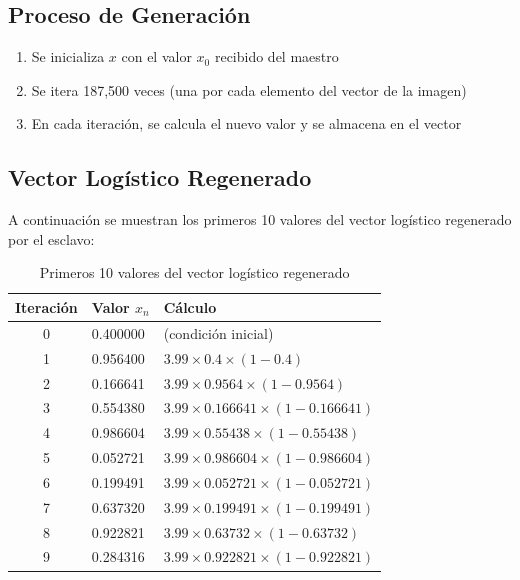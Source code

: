 \documentclass[12pt,a4paper]{article}
\begin{document}
	\subsection{Proceso de Generación}
	
	\begin{enumerate}
		\item Se inicializa $x$ con el valor $x_0$ recibido del maestro
		\item Se itera 187,500 veces (una por cada elemento del vector de la imagen)
		\item En cada iteración, se calcula el nuevo valor y se almacena en el vector
	\end{enumerate}
	
	\subsection{Vector Logístico Regenerado}
	
	A continuación se muestran los primeros 10 valores del vector logístico regenerado por el esclavo:
	
	\begin{table}[H]
		\centering
		\caption{Primeros 10 valores del vector logístico regenerado}
		\label{tab:logistic_esclavo}
		\begin{tabular}{@{}cll@{}}
			\toprule
			\textbf{Iteración} & \textbf{Valor $x_n$} & \textbf{Cálculo} \\ \midrule
			0 & 0.400000 & (condición inicial) \\
			1 & 0.956400 & $3.99 \times 0.4 \times (1 - 0.4)$ \\
			2 & 0.166641 & $3.99 \times 0.9564 \times (1 - 0.9564)$ \\
			3 & 0.554380 & $3.99 \times 0.166641 \times (1 - 0.166641)$ \\
			4 & 0.986604 & $3.99 \times 0.55438 \times (1 - 0.55438)$ \\
			5 & 0.052721 & $3.99 \times 0.986604 \times (1 - 0.986604)$ \\
			6 & 0.199491 & $3.99 \times 0.052721 \times (1 - 0.052721)$ \\
			7 & 0.637320 & $3.99 \times 0.199491 \times (1 - 0.199491)$ \\
			8 & 0.922821 & $3.99 \times 0.63732 \times (1 - 0.63732)$ \\
			9 & 0.284316 & $3.99 \times 0.922821 \times (1 - 0.922821)$ \\ \bottomrule
		\end{tabular}
	\end{table}
	
\end{document}
